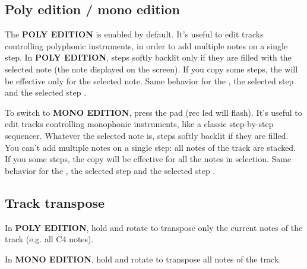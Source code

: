 

\subsection{Poly edition / mono edition}

The \textbf{POLY EDITION} is enabled by default. It's useful to edit tracks controlling polyphonic instruments, in order to add multiple notes on a single step. In \textbf{POLY EDITION}, steps softly backlit only if they are filled with the selected note (the note displayed on the screen). If you  copy  some steps, the  will be effective only for the selected note. Same behavior for the , the selected step  and the selected step .

To switch to \textbf{MONO EDITION}, press the  pad (rec led will flash). It's useful to edit tracks controlling monophonic instruments, like a classic step-by-step sequencer. Whatever the selected note is, steps softly backlit if they are filled. You can't add multiple notes on a single step: all notes of the track are stacked. If you   some steps, the copy will be effective for all the notes in selection. Same behavior for the , the selected step  and the selected step .


\subsection{Track transpose}

In \textbf{POLY EDITION}, hold  and rotate \encodericon{} to transpose only the current notes of the track (e.g. all C4 notes).


In \textbf{MONO EDITION}, hold  and rotate \encodericon{} to transpose all notes of the track.


